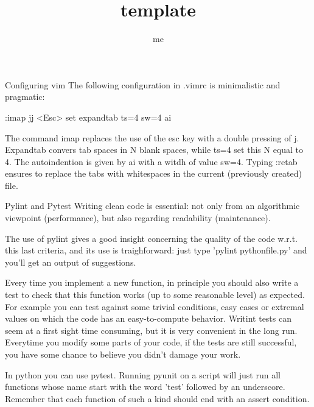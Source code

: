 \documentclass[10pt]{article}
\title {template}
\author {me}
\begin{document}
\maketitle
\begin{section}{Configuring vim}
The following configuration in .vimrc is minimalistic and pragmatic:


:imap jj <Esc>
set expandtab ts=4 sw=4 ai


The command imap replaces the use of the esc key with a double pressing of j.
Expandtab convers tab spaces in N blank spaces, while ts=4 set this N equal
to 4. The autoindention is given by ai with a witdh of value sw=4.
Typing :retab ensures to replace
the tabs with whitespaces in the current (previously created) file.
\end{section}


\begin{section}{Pylint and Pytest}
Writing clean code is essential: not only from an algorithmic viewpoint 
(performance), but also regarding readability (maintenance).


The use of pylint gives a good insight concerning the quality of the code
w.r.t. this last criteria, and its use is traighforward: just type
'pylint pythonfile.py' and you'll get an output of suggestions.


Every time you implement a new function, in principle you should also
write a test to check that this function works (up to some reasonable level)
as expected. For example you can test against some trivial conditions, easy
cases or extremal values on which the code has an easy-to-compute
behavior. Writint tests can seem at a first sight time consuming, but it is
very convenient in the long run. Everytime you modify some parts of your code,
if the tests are still successful, you have some chance to believe you didn't
damage your work.


In python you can use pytest. Running pyunit on a script will just run
all functions whose name start with the word 'test' followed by an underscore.
Remember that each function of such a kind should end with an assert condition.


\end{section}
\end{document}
